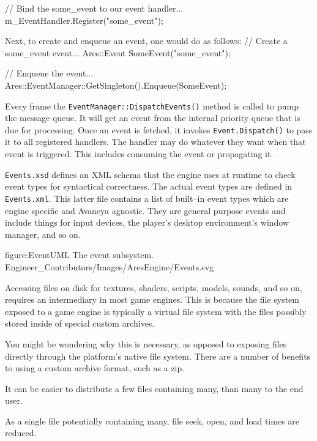 \startCodeExample
// Bind the some_event to our event handler...
m_EventHandler.Register("some_event");
\stopCodeExample

Next, to create and enqueue an event, one would do as follows:
\startCodeExample
// Create a some_event event...
Ares::Event SomeEvent("some_event");

// Enqueue the event...
Ares::EventManager::GetSingleton().Enqueue(SomeEvent);
\stopCodeExample

Every frame the {\tt EventManager::DispatchEvents()} method is called to pump the message queue. It will get an event from the internal priority queue that is due for processing. Once an event is fetched, it invokes {\tt Event.Dispatch()} to pass it to all registered handlers. The handler may do whatever they want when that event is triggered. This includes consuming the event or propagating it.

{\tt Events.xsd} defines an XML schema that the engine uses at runtime to check event types for syntactical correctness. The actual event types are defined in {\tt Events.xml}. This latter file contains a list of built--in event types which are engine specific and Avaneya agnostic. They are general purpose events and include things for input devices, the player's desktop environment's window manager, and so on.

\FullPageDiagram
    {figure:EventUML}
    {The event subsystem.}
    {Engineer_Contributors/Images/AresEngine/Events.svg}

\page 
{}
Accessing files on disk for textures, shaders, scripts, models, sounds, and so on, requires an intermediary in most game engines. This is because the file system exposed to a game engine is typically a virtual file system with the files possibly stored inside of special custom archives. %

You might be wondering why this is necessary, as opposed to exposing  files directly through the platform's native file system. There are a number of benefits to using a custom archive format, such as a zip.

\startitemize[4]

\item
It can be easier to distribute a few files containing many, than many to the end user.

\item
As a single file potentially containing many, file seek, open, and load times are reduced.

